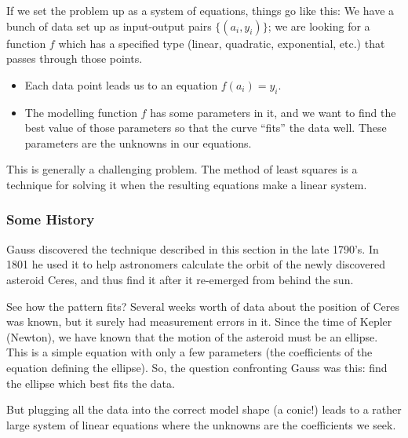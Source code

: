 \documentclass[10pt,]{book}
\theoremstyle{plain}
\theoremstyle{definition}
\numberwithin{equation}{section}
\begin{document}
        If we set the problem up as a system of equations, things go like this:
        We have a bunch of data set up as input-output pairs \(\{ (a_i, y_i) \}\);
        we are looking for a function \(f\) which has a specified type (linear,
        quadratic, exponential, etc.) that passes through those points.
\begin{itemize}
\item{}Each data point leads us to an equation \(f(a_i) = y_i\).\item{}
          The modelling function $f$ has some parameters in it, and we want to
          find the best value of those parameters so that the curve ``fits''
          the data well. These parameters are the unknowns in our equations.
        \end{itemize}
\par

        This is generally a challenging problem. The method of least squares is
        a technique for solving it when the resulting equations make a linear
        system.
\typeout{************************************************}
\typeout{************************************************}
\subsubsection[Some History]{Some History}\label{subsubsection-45}

        Gauss discovered the technique described in this section in the late
        1790's. In 1801 he used it to help astronomers calculate the orbit of
        the newly discovered asteroid Ceres, and thus find it after it re-emerged
        from behind the sun.
\par

        See how the pattern fits? Several weeks worth of data about the position
        of Ceres was known, but it surely had measurement errors in it. Since
        the time of Kepler (Newton), we have known that the motion of the
        asteroid must be an ellipse. This is a simple equation with only a few
        parameters (the coefficients of the equation defining the ellipse). So,
        the question confronting Gauss was this: find the ellipse which best
        fits the data.
\par

        But plugging all the data into the correct model shape (a conic!) leads
        to a rather large system of linear equations where the unknowns are the
        coefficients we seek.
\typeout{************************************************}
\typeout{************************************************}
\end{document}
